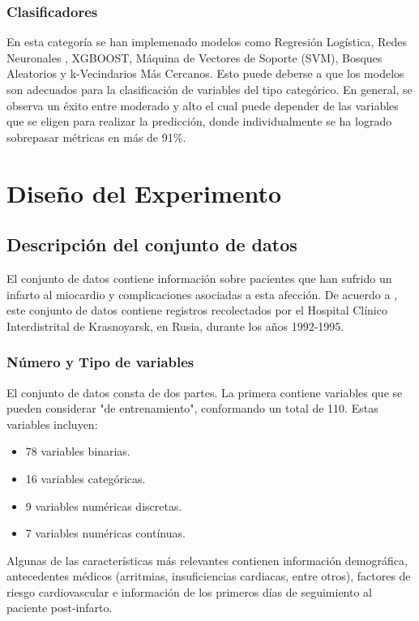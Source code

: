 \documentclass[conference]{IEEEtran}
\begin{document}
\subsubsection{Clasificadores}
 En esta categoría se han implemenado modelos como Regresión Logística\cite{bx}\cite{bz}, Redes Neuronales \cite{bx}\cite{bz}\cite{ll}\cite{bp}, XGBOOST\cite{bz}\cite{bp}, Máquina de Vectores de Soporte (SVM)\cite{bz}, Bosques Aleatorios\cite{bz} y k-Vecindarios Más Cercanos\cite{b?}\cite{by}. Esto puede deberse a que los modelos son adecuados para la clasificación de variables del tipo categórico. En general, se observa un éxito entre moderado y alto el cual puede depender de las variables que se eligen para realizar la predicción, donde individualmente se ha logrado sobrepasar métricas en más de 91\%.

\section{Diseño del Experimento}
\subsection{Descripción del conjunto de datos}\label{EDA}
El conjunto de datos contiene información sobre pacientes que han sufrido un infarto al miocardio y complicaciones asociadas a esta afección. De acuerdo a \cite{b1}, este conjunto de datos contiene registros recolectados por el Hospital Clínico Interdistrital de Krasnoyarsk, en Rusia, durante los años 1992-1995. 
\subsubsection{Número y Tipo de variables}\label{nvar}
El conjunto de datos consta de dos partes. La primera contiene variables que se pueden considerar "de entrenamiento", conformando un total de 110. Estas variables incluyen:
\begin{itemize}
    \item 78 variables binarias.
    \item 16 variables categóricas.
    \item 9 variables numéricas discretas.
    \item 7 variables numéricas contínuas.
\end{itemize}

Algunas de las características más relevantes contienen información demográfica, antecedentes médicos (arritmias, insuficiencias cardiacas, entre otros), factores de riesgo cardiovascular e información de los primeros días de seguimiento al paciente post-infarto.
\end{document}
